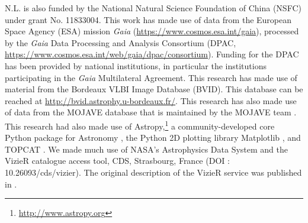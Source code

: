 \documentclass{aa}
\begin{document}
\begin{acknowledgements}
  N.L. is also funded by the National Natural Science Foundation of China (NSFC) under grant No. 11833004.
  This work has made use of data from the European Space Agency (ESA) mission {\it Gaia} (\url{https://www.cosmos.esa.int/gaia}), processed by the {\it Gaia} Data Processing and Analysis Consortium (DPAC, \url{https://www.cosmos.esa.int/web/gaia/dpac/consortium}).
  Funding for the DPAC has been provided by national institutions, in particular the institutions participating in the {\it Gaia} Multilateral Agreement.
  This research has made use of material from the Bordeaux VLBI Image Database (BVID).
  This database can be reached at \url{http://bvid.astrophy.u-bordeaux.fr/}.
  This research has also made use of data from the MOJAVE database that is maintained by the MOJAVE team \citep{2018ApJS..234...12L}.
  This research had also made use of Astropy,\footnote{\href{http://www.astropy.org}{http://www.astropy.org}} a community-developed core Python package for Astronomy \citep{astropy:2018},
  the Python 2D plotting library Matplotlib \citep{matplotlib:2007}, and TOPCAT \citep{topcat}.
  We made much use of NASA's Astrophysics Data System and the VizieR catalogue access tool, CDS,
  Strasbourg, France (DOI : 10.26093/cds/vizier). The original description of the VizieR service was published in \citet{vizier}.

\end{acknowledgements}



\end{document}
